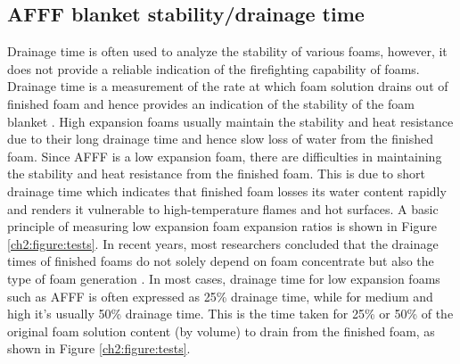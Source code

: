 \documentclass[12pt]{report}
\begin{document}
\subsection{AFFF blanket stability/drainage time}
Drainage time is often used to analyze the stability of various foams, however, it does not provide a reliable indication of the firefighting capability of foams. Drainage time is a measurement of the rate at which foam solution drains out of finished foam and hence provides an indication of the stability of the foam blanket \cite{aamodt2020review}. High expansion foams usually maintain the stability and heat resistance due to their long drainage time and hence slow loss of water from the finished foam. 
Since AFFF is a low expansion foam, there are difficulties in maintaining the stability and heat resistance from the finished foam. This is due to short drainage time which indicates that finished foam losses its water content rapidly and renders it vulnerable to high-temperature flames and hot surfaces. A basic principle of measuring low expansion foam expansion ratios is shown in Figure \ref{ch2:figure:tests}. In recent years, most researchers concluded that the drainage times of finished foams do not solely depend on foam concentrate but also the type of foam generation \cite{martin2012fire}. In most cases, drainage time for low expansion foams such as AFFF is often expressed as 25\% drainage time, while for medium and high it’s usually 50\% drainage time. This is the time taken for 25\% or 50\% of the original foam solution content (by volume) to drain from the finished foam, as shown in Figure \ref{ch2:figure:tests}.
\end{document}
